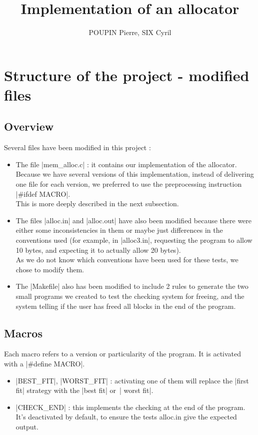 \documentclass[twoside]{article}
\author{POUPIN Pierre, SIX Cyril}
\title{\textbf{Implementation of an allocator}}
\begin{document}
\maketitle
\section{Structure of the project - modified files}
\subsection{Overview}
Several files have been modified in this project :
\begin{itemize}
	\item The file |mem_alloc.c| : it contains our implementation of the
		allocator. Because we have several versions of this implementation,
		instead of delivering one file for each version, we preferred to use
		the preprocessing instruction |#ifdef MACRO|.\\
		This is more deeply described in the next subsection.
	\item The files |alloc.in| and |alloc.out| have also been modified because
		there were either some inconsistencies in them or maybe just
		differences in the conventions used (for example, in |alloc3.in|,
		requesting the program to allow 10 bytes, and expecting it to actually
		allow 20 bytes).\\
		As we do not know which conventions have been used for these tests, we
		chose to modify them.
	\item The |Makefile| also has been modified to include 2 rules to generate
		the two small programs we created to test the checking system for
		freeing, and the system telling if the user has freed all blocks in the
		end of the program.
\end{itemize}

\subsection{Macros}
Each macro refers to a version or particularity of the program. It is activated
with a |#define MACRO|.
\begin{itemize}
	\item |BEST_FIT|, |WORST_FIT| : activating one of them will replace the
		|first fit| strategy with the |best fit| or | worst fit|.
	\item |CHECK_END| : this implements the checking at the end of the program.
		It's deactivated by default, to ensure the tests alloc.in give the 
		expected output.
\end{itemize}
\end{document}
